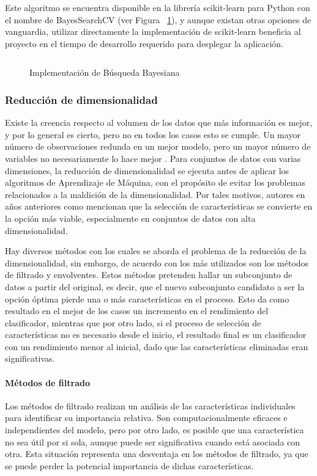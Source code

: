 Este algoritmo se encuentra disponible en la librería scikit-learn \parencite{sklearn_api} para Python con el nombre de BayesSearchCV (ver Figura ~\ref{fig:impbusbay}), y aunque existan otras opciones de vanguardia, utilizar directamente la implementación de scikit-learn beneficia al proyecto en el tiempo de desarrollo requerido para desplegar la aplicación.

\begin{figure}[H]
    \centering
    \caption{Implementación de Búsqueda Bayesiana}
    \inputminted{Python}{pycode/bayesiansearch.py}
    \label{fig:impbusbay}
\end{figure}


\subsubsection{Reducción de dimensionalidad}
Existe la creencia respecto al volumen de los datos que más información es mejor, y por lo general es cierto, pero no en todos los casos esto se cumple. Un mayor número de observaciones redunda en un mejor modelo, pero un mayor número de variables no necesariamente lo hace mejor \parencite{Guerrero2016}. Para conjuntos de datos con varias dimensiones, la reducción de dimensionalidad se ejecuta antes de aplicar los algoritmos de Aprendizaje de Máquina, con el propósito de evitar los problemas relacionados a la maldición de la dimensionalidad. Por tales motivos, autores en años anteriores como \textcite{Finley2005} mencionan que la selección de características se convierte en la opción más viable, especialmente en conjuntos de datos con alta dimensionalidad.

Hay diversos métodos con los cuales se aborda el problema de la reducción de la dimensionalidad, sin embargo, de acuerdo con \textcite{Finley2005,Sanchez-Marono2007} los más utilizados son los métodos de filtrado y envolventes. Estos métodos pretenden hallar un subconjunto de datos a partir del original, es decir, que el nuevo subconjunto candidato a ser la opción óptima pierde una o más características en el proceso. Esto da como resultado en el mejor de los casos un incremento en el rendimiento del clasificador, mientras que por otro lado, si el proceso de selección de características no es necesario desde el inicio, el resultado final es un clasificador con un rendimiento menor al inicial, dado que las características eliminadas eran significativas. 
 
\paragraph{Métodos de filtrado} Los métodos de filtrado realizan un análisis de las características individuales para identificar su importancia relativa. Son computacionalmente eficaces e independientes del modelo, pero por otro lado, es posible que una característica no sea útil por si sola, aunque puede ser significativa cuando está asociada con otra. Esta situación representa una desventaja en los métodos de filtrado, ya que se puede perder la potencial importancia de dichas características. 

